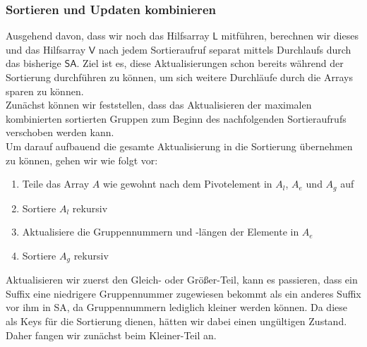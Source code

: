 \subsubsection{Sortieren und Updaten kombinieren}
Ausgehend davon, dass wir noch das Hilfsarray $\mathsf{L}$ mitführen, berechnen wir dieses und das Hilfsarray $\mathsf{V}$ nach jedem Sortieraufruf separat mittels Durchlaufs durch das bisherige $\mathsf{SA}$. Ziel ist es, diese Aktualisierungen schon bereits während der Sortierung durchführen zu können, um sich weitere Durchläufe durch die Arrays sparen zu können. \\
Zunächst können wir feststellen, dass das Aktualisieren der maximalen kombinierten sortierten Gruppen zum Beginn des nachfolgenden Sortieraufrufs verschoben werden kann.  \\
Um darauf aufbauend die gesamte Aktualisierung in die Sortierung übernehmen zu können, gehen wir wie folgt vor:
\begin{enumerate}
\item Teile das Array $A$ wie gewohnt nach dem Pivotelement in $A_l$, $A_e$ und $A_g$ auf
\item Sortiere $A_l$ rekursiv
\item Aktualisiere die Gruppennummern und -längen der Elemente in $A_e$
\item Sortiere $A_g$ rekursiv
\end{enumerate}

Aktualisieren wir zuerst den \glqq Gleich\grqq{}- oder \glqq Größer\grqq{}-Teil, kann es passieren, dass 
ein Suffix eine niedrigere Gruppennummer zugewiesen bekommt als ein anderes Suffix vor ihm in SA, da 
Gruppennummern lediglich kleiner werden können. Da diese als Keys für die Sortierung dienen, hätten wir dabei einen ungültigen Zustand. Daher fangen wir zunächst beim \glqq Kleiner\grqq{}-Teil an. \\

